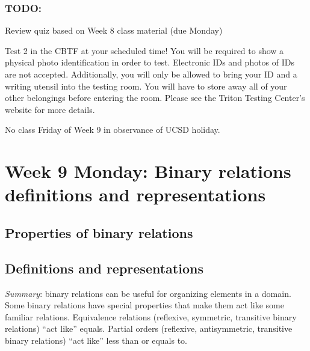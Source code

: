 \subsubsection*{TODO:}
\begin{list}
   {\itemsep2pt}
    \item Review quiz based on Week 8 class material (due Monday)
    \item Test 2 in the CBTF at your scheduled time!
You will be required to show a physical photo identification in order
to test. Electronic IDs and photos of IDs are not accepted. Additionally, you will only be allowed
to bring your ID and a writing utensil into the testing room. You will have to store away all of
your other belongings before entering the room. Please see the Triton Testing Center's website
for more details.
    \item No class Friday of Week 9 in observance of UCSD holiday.

\end{list}

\newpage
\newpage
\section*{Week 9 Monday: Binary relations definitions and representations}
\subsection*{Properties of binary relations}


\vfill


\vfill


\vfill


\vfill
\newpage

\vfill

\newpage
\subsection*{Definitions and representations}



{\it Summary}: binary relations can be useful for organizing elements in a domain. 
Some binary relations have special properties that make them act like some familiar relations.
Equivalence relations (reflexive, symmetric, transitive binary relations) ``act like'' equals.
Partial orders (reflexive, antisymmetric, transitive binary relations) ``act like'' less than or equals to.

\vfill

\vfill
\newpage

